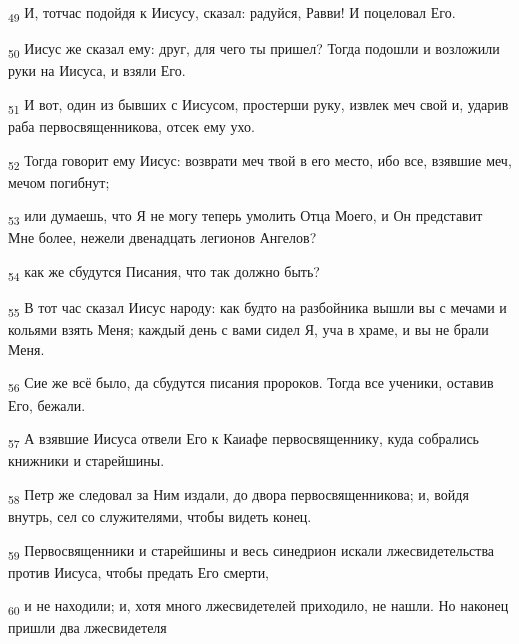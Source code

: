 \begin{tcolorbox}
\textsubscript{49} И, тотчас подойдя к Иисусу, сказал: радуйся, Равви! И поцеловал Его.
\end{tcolorbox}
\begin{tcolorbox}
\textsubscript{50} Иисус же сказал ему: друг, для чего ты пришел? Тогда подошли и возложили руки на Иисуса, и взяли Его.
\end{tcolorbox}
\begin{tcolorbox}
\textsubscript{51} И вот, один из бывших с Иисусом, простерши руку, извлек меч свой и, ударив раба первосвященникова, отсек ему ухо.
\end{tcolorbox}
\begin{tcolorbox}
\textsubscript{52} Тогда говорит ему Иисус: возврати меч твой в его место, ибо все, взявшие меч, мечом погибнут;
\end{tcolorbox}
\begin{tcolorbox}
\textsubscript{53} или думаешь, что Я не могу теперь умолить Отца Моего, и Он представит Мне более, нежели двенадцать легионов Ангелов?
\end{tcolorbox}
\begin{tcolorbox}
\textsubscript{54} как же сбудутся Писания, что так должно быть?
\end{tcolorbox}
\begin{tcolorbox}
\textsubscript{55} В тот час сказал Иисус народу: как будто на разбойника вышли вы с мечами и кольями взять Меня; каждый день с вами сидел Я, уча в храме, и вы не брали Меня.
\end{tcolorbox}
\begin{tcolorbox}
\textsubscript{56} Сие же всё было, да сбудутся писания пророков. Тогда все ученики, оставив Его, бежали.
\end{tcolorbox}
\begin{tcolorbox}
\textsubscript{57} А взявшие Иисуса отвели Его к Каиафе первосвященнику, куда собрались книжники и старейшины.
\end{tcolorbox}
\begin{tcolorbox}
\textsubscript{58} Петр же следовал за Ним издали, до двора первосвященникова; и, войдя внутрь, сел со служителями, чтобы видеть конец.
\end{tcolorbox}
\begin{tcolorbox}
\textsubscript{59} Первосвященники и старейшины и весь синедрион искали лжесвидетельства против Иисуса, чтобы предать Его смерти,
\end{tcolorbox}
\begin{tcolorbox}
\textsubscript{60} и не находили; и, хотя много лжесвидетелей приходило, не нашли. Но наконец пришли два лжесвидетеля
\end{tcolorbox}
